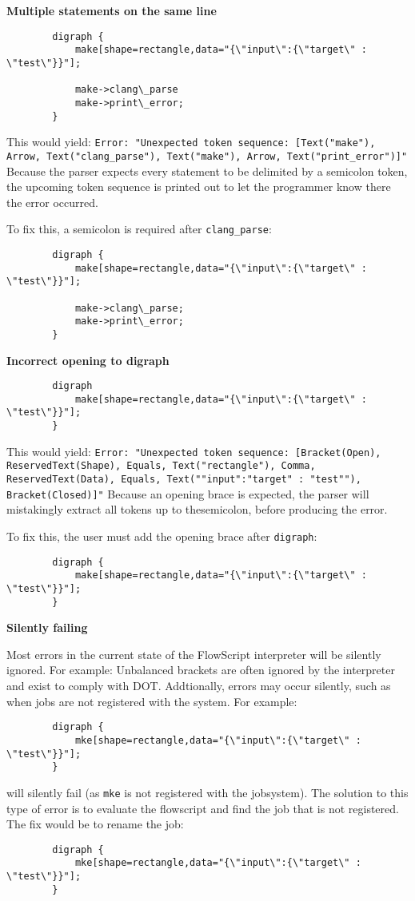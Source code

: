 \documentclass{article}
\begin{document}
		\textbf{Multiple statements on the same line}
		\begin{verbatim}
		digraph {
		    make[shape=rectangle,data="{\"input\":{\"target\" : \"test\"}}"];
    
		    make->clang\_parse
		    make->print\_error;
		}
    	\end{verbatim}

		This would yield: \texttt{Error: "Unexpected token sequence: [Text("make"), Arrow, Text("clang\_parse"), Text("make"), Arrow, Text("print\_error")]"}
		Because the parser expects every statement to be delimited by a semicolon token, the upcoming token sequence is printed out to let the programmer know there the error occurred.

		To fix this, a semicolon is required after \texttt{clang\_parse}:
		\begin{verbatim}
		digraph {
		    make[shape=rectangle,data="{\"input\":{\"target\" : \"test\"}}"];
    
		    make->clang\_parse;
		    make->print\_error;
		}
    	\end{verbatim}

		

		\textbf{Incorrect opening to digraph}
		\begin{verbatim}
		digraph 
		    make[shape=rectangle,data="{\"input\":{\"target\" : \"test\"}}"];
		}
		\end{verbatim}
		This would yield: \texttt{Error: "Unexpected token sequence: [Bracket(Open), ReservedText(Shape), Equals, Text("rectangle"), Comma, ReservedText(Data), Equals, Text("{"input":{"target" : "test"}}"), Bracket(Closed)]"}
		Because an opening brace is expected, the parser will mistakingly extract all tokens up to thesemicolon, before producing the error.

		To fix this, the user must add the opening brace after \texttt{digraph}:

		\begin{verbatim}
		digraph {
		    make[shape=rectangle,data="{\"input\":{\"target\" : \"test\"}}"];
		}
		\end{verbatim}

		
		\textbf{Silently failing}

		Most errors in the current state of the FlowScript interpreter will be silently ignored. For example: Unbalanced brackets are often ignored by the interpreter and exist to comply with DOT. Addtionally, errors may occur silently, such as when jobs are not registered with the system. For example:
		\begin{verbatim}
		digraph {
		    mke[shape=rectangle,data="{\"input\":{\"target\" : \"test\"}}"];
		}
		\end{verbatim}
		will silently fail (as \texttt{mke} is not registered with the jobsystem).
		The solution to this type of error is to evaluate the flowscript and find the job that is not registered.
		The fix would be to rename the job:
		\begin{verbatim}
		digraph {
		    mke[shape=rectangle,data="{\"input\":{\"target\" : \"test\"}}"];
		}
		\end{verbatim}

		
\end{document}
